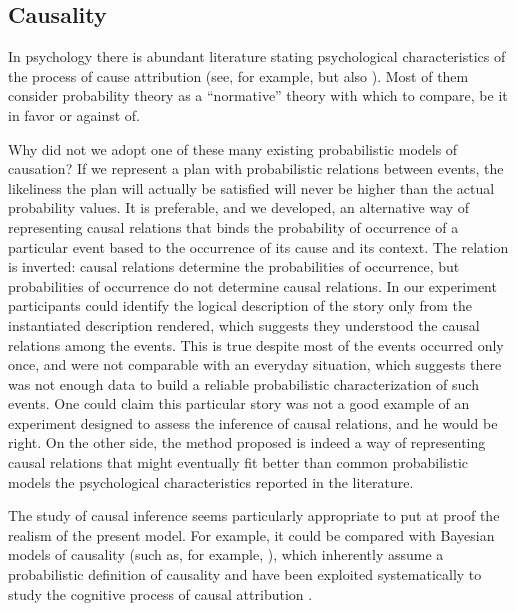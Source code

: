 \documentclass[
		twoside,openright,titlepage,numbers=noenddot,manychapters,
		headinclude,%
                footinclude=false,cleardoublepage=empty,
                BCOR=5mm,
		fontsize=11pt, %
                 enabledeprecatedfontcommands]{scrreprt}
\begin{document}
\subsection{Causality}

In psychology there is abundant literature stating psychological characteristics of the process of cause attribution  (see, for example, \cite{Cheng1990, cheng1991cve, cheng1993scl, goldvarg2001ncm, griffiths2007mcm, Goodman2011} but also \cite{Rosch1994}). Most of them consider probability theory as a ``normative'' theory with which to compare, be it in favor or against of. 

Why did not we adopt one of these many existing probabilistic models of causation? If we represent a plan with probabilistic relations between events, the likeliness the plan will actually be satisfied will never be higher than the actual probability values. It is preferable, and we developed, an alternative way of representing causal relations that binds the probability of occurrence of a particular event based to the occurrence of its cause and its context. The relation is inverted: causal relations determine the probabilities of occurrence, but probabilities of occurrence do not determine causal relations. In our experiment participants could identify the logical description of the story only from the instantiated description rendered, which suggests they understood the causal relations among the events. This is true despite most of the events occurred only once, and were not comparable with an everyday situation, which suggests there was not enough data to build a reliable probabilistic characterization of such events. One could claim this particular story was not a good example of an experiment designed to assess the inference of causal relations, and he would be right. On the other side, the method proposed is indeed a way of representing causal relations that might eventually fit better than common probabilistic models the psychological characteristics reported in the literature.

The study of causal inference seems particularly appropriate to put at proof the realism of the present model. For example, it could be compared with Bayesian models of causality (such as, for example, \cite{Kemp2007}), which inherently assume a probabilistic definition of causality and have been exploited systematically to study the cognitive process of causal attribution \cite[]{holyoak2011bayesian}. 
\end{document}
